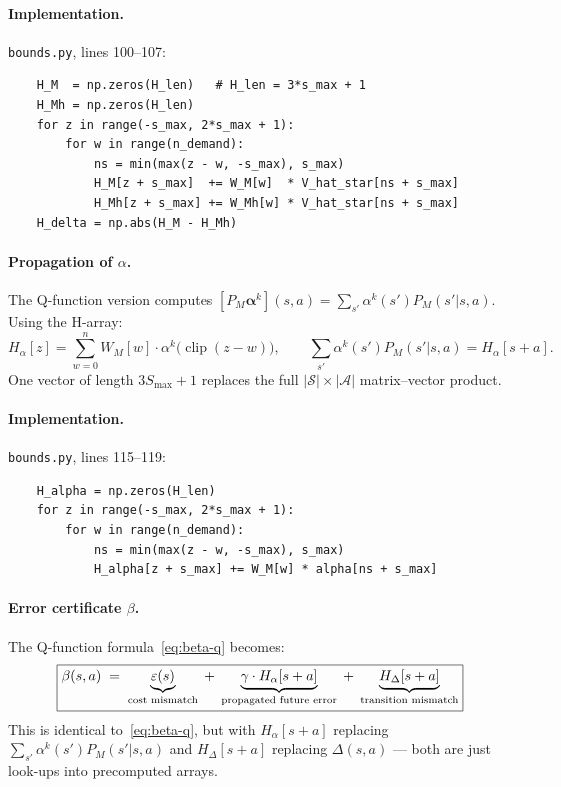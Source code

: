 \documentclass[11pt]{article}
\newcommand{\Smax}{S_{\max}}
\newcommand{\clip}{\operatorname{clip}}
\newtheorem{remark}{Remark}
\begin{document}
\paragraph{Implementation.}
\texttt{bounds.py}, lines 100--107:
\begin{verbatim}
    H_M  = np.zeros(H_len)   # H_len = 3*s_max + 1
    H_Mh = np.zeros(H_len)
    for z in range(-s_max, 2*s_max + 1):
        for w in range(n_demand):
            ns = min(max(z - w, -s_max), s_max)
            H_M[z + s_max]  += W_M[w]  * V_hat_star[ns + s_max]
            H_Mh[z + s_max] += W_Mh[w] * V_hat_star[ns + s_max]
    H_delta = np.abs(H_M - H_Mh)
\end{verbatim}

\paragraph{Propagation of $\alpha$.}
The Q-function version computes $[P_M \boldsymbol{\alpha}^k](s,a) = \sum_{s'}
\alpha^k(s') P_M(s'|s,a)$.  Using the H-array:
\begin{equation}\label{eq:h-alpha}
  H_\alpha[z] = \sum_{w=0}^{n} W_M[w] \cdot \alpha^k\bigl(\clip(z-w)\bigr),
  \qquad
  \sum_{s'} \alpha^k(s') P_M(s'|s,a) = H_\alpha[s+a].
\end{equation}
One vector of length $3\Smax + 1$ replaces the full $|\mathcal{S}| \times
|\mathcal{A}|$ matrix--vector product.

\paragraph{Implementation.}
\texttt{bounds.py}, lines 115--119:
\begin{verbatim}
    H_alpha = np.zeros(H_len)
    for z in range(-s_max, 2*s_max + 1):
        for w in range(n_demand):
            ns = min(max(z - w, -s_max), s_max)
            H_alpha[z + s_max] += W_M[w] * alpha[ns + s_max]
\end{verbatim}


\paragraph{Error certificate $\beta$.}
The Q-function formula~\eqref{eq:beta-q} becomes:
\begin{equation}\label{eq:beta}
  \boxed{%
  \beta(s, a)
  \;=\; \underbrace{\varepsilon(s)}_{\text{cost mismatch}}
  \;+\; \underbrace{\gamma \cdot H_\alpha[s + a]}_{\text{propagated future error}}
  \;+\; \underbrace{H_\Delta[s + a]}_{\text{transition mismatch}}
  }
\end{equation}
This is identical to~\eqref{eq:beta-q}, but with $H_\alpha[s+a]$ replacing
$\sum_{s'} \alpha^k(s') P_M(s'|s,a)$ and $H_\Delta[s+a]$ replacing
$\Delta(s,a)$ --- both are just look-ups into precomputed arrays.
\end{document}
